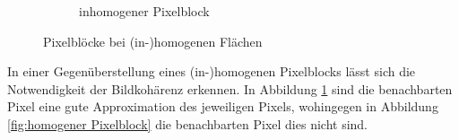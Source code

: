 \begin{figure}[H]
\begin{subfigure}[b]{0.4\textwidth}
        \caption{inhomogener Pixelblock}
        \label{fig:Inhomogener Pixelblock}
    \end{subfigure}

    \caption{Pixelblöcke bei (in-)homogenen Flächen}\label{fig:Pixelblöcke}
\end{figure}

In einer Gegenüberstellung eines (in-)homogenen Pixelblocks lässt sich die Notwendigkeit der Bildkohärenz erkennen.
In Abbildung \ref{fig:Inhomogener Pixelblock} sind die benachbarten Pixel eine gute Approximation des jeweiligen Pixels, 
wohingegen in Abbildung \ref{fig:homogener Pixelblock} die benachbarten Pixel dies nicht sind.
